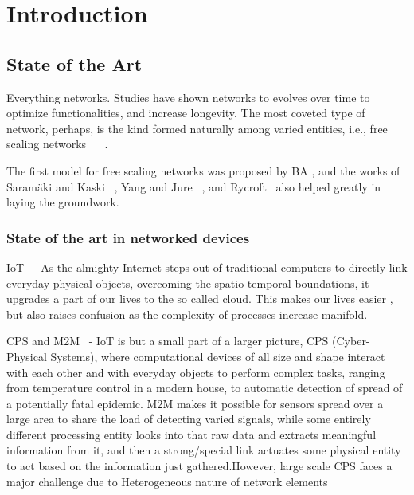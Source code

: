 
\chapter{Introduction} %

\label{Chapter1} %



\section{State of the Art}
Everything networks. Studies have shown networks to evolves over time to optimize functionalities, and increase longevity. The most coveted type of network, perhaps, is the kind formed naturally among varied entities, i.e., free scaling networks ~\cite{1999Sci...286..509B} ~\cite{2002RvMP...74...47A}.

The first model for free scaling networks was proposed by BA , and the works of Saramäki  and Kaski~\cite{Saramaki200480} , Yang and Jure~\cite{Yang_modelinginformation} , and  Rycroft~\cite{Rycroft2007565} also helped greatly in laying the groundwork.

\subsection{State of the art in networked devices}

IoT~\cite{Internet-of-things} - As the almighty Internet steps out of traditional computers to directly link everyday physical objects, overcoming the spatio-temporal boundations, it upgrades a part of our lives to the so called cloud.
This makes our lives easier , but also raises confusion as the complexity of processes increase manifold. 

CPS and M2M~\cite{6601317} - IoT is but a small part of a larger picture, CPS (Cyber-Physical Systems), where computational devices of all size and shape interact with each other and with everyday objects to perform complex tasks, ranging from temperature control in a modern house, to automatic detection of spread of a potentially fatal epidemic.
M2M makes it possible for sensors spread over a large area to share the load of detecting varied signals, while some entirely different processing entity looks into that raw data and extracts meaningful information from it, and then a strong/special link actuates some physical entity to act based on the  information just gathered.However, large scale CPS faces a major challenge due to Heterogeneous nature of network elements

